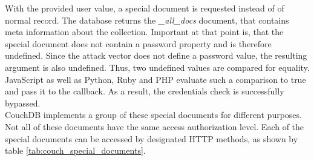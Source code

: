 With the provided user value, a special document is requested instead of of normal record. The database returns the \emph{\_all\_docs} document, that contains meta information about the collection. Important at that point is, that the special document does not contain a password property and is therefore undefined. Since the attack vector does not define a password value, the resulting argument is also undefined. Thus, two undefined values are compared for equality. JavaScript as well as Python, Ruby and PHP evaluate such a comparison to true and pass it to the callback. As a result, the credentials check is successfully bypassed.\\

CouchDB implements a group of these special documents for different purposes. Not all of these documents have the same access authorization level. Each of the special documents can be accessed by designated HTTP methods, as shown by table \ref{tab:couch_special_documents}. \\


